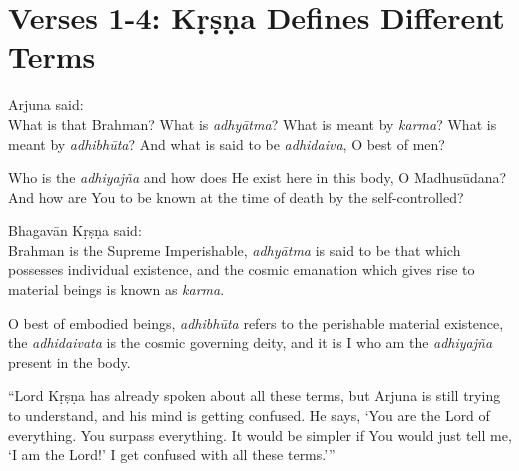 \section{Verses 1-4: Kṛṣṇa Defines Different Terms}\label{sec-verses-1-4-krsna-defines-different-terms}

{\hspace*{1em}Arjuna said: \\
What is that Brahman? What is \textit{adhyātma}? What is meant by \textit{karma}? What is meant by \textit{adhibhūta}? And what is said to be \textit{adhidaiva}, O best of men?}

{Who is the \textit{adhiyajña} and how does He exist here in this body, O Madhusūdana? And how are You to be known at the time of death by the self-controlled?}

{\hspace*{1em}Bhagavān Kṛṣṇa said: \\
Brahman is the Supreme Imperishable, \textit{adhyātma} is said to be that which possesses individual existence, and the cosmic emanation which gives rise to material beings is known as \textit{karma}.}

{O best of embodied beings, \textit{adhibhūta} refers to the perishable material existence, the \textit{adhidaivata} is the cosmic governing deity, and it is I who am the \textit{adhiyajña} present in the body.}



\enquote{Lord Kṛṣṇa has already spoken about all these terms, but Arjuna is still trying to understand, and his mind is getting confused. He says, \enquote{You are the Lord of everything. You surpass everything. It would be simpler if You would just tell me, ‘I am the Lord!’ I get confused with all these terms.}}

